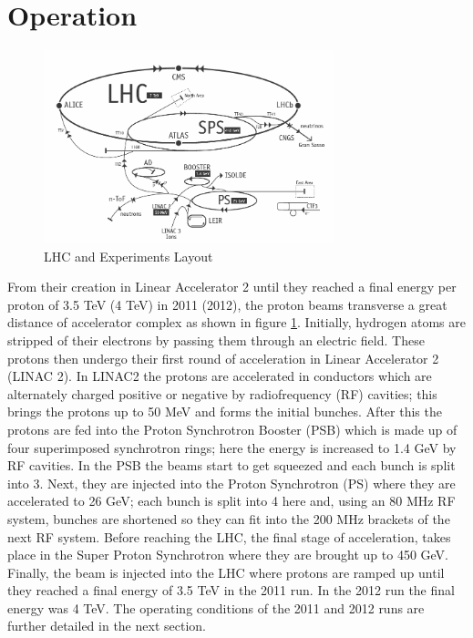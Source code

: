 \section{Operation}
\begin{figure}[t]
  \centering
	\includegraphics[width=0.75\textwidth]{images/LHCLayout.png}
  	\caption[e/$\gamma$ LHC Layout]
   	{LHC and Experiments Layout}
	\label{fig:LHCRings}
\end{figure}

From their creation in Linear Accelerator 2 until they reached
a final energy per proton of 3.5 TeV (4 TeV) in 2011 (2012),
the proton beams transverse a great distance of accelerator complex %
as shown in figure \ref{fig:LHCRings}.%
Initially, hydrogen atoms are stripped of their electrons by passing them
through an electric field. These protons
then undergo their first round of acceleration in Linear Accelerator 2 (LINAC 2).
In LINAC2 the protons are accelerated in conductors which
are alternately charged positive or negative by radiofrequency (RF) cavities;
this brings the protons up to 50 MeV and forms the initial bunches. 
After this the protons are
fed into the Proton Synchrotron Booster (PSB) which is made up 
of four superimposed synchrotron rings; here the energy
is increased to 1.4 GeV by RF cavities. In
the PSB the beams start to get squeezed and each bunch is 
split into 3. 
Next, they are injected into the Proton
Synchrotron (PS) where they are accelerated to 26 GeV; each
bunch is split into 4 here and, using an 80 MHz RF system,
bunches are shortened so they can fit into the 200 MHz brackets
of the next RF system. Before reaching the LHC, the final
stage of acceleration, takes place in the
Super Proton Synchrotron where they are brought up to 450 GeV.
Finally, the beam is injected into the LHC where protons are ramped
up until they reached a final energy of 3.5 TeV 
in the 2011 run. In the 2012 run the final energy was 4 TeV. 
The operating conditions of the 2011 and 2012 runs are further
detailed in the next section.

